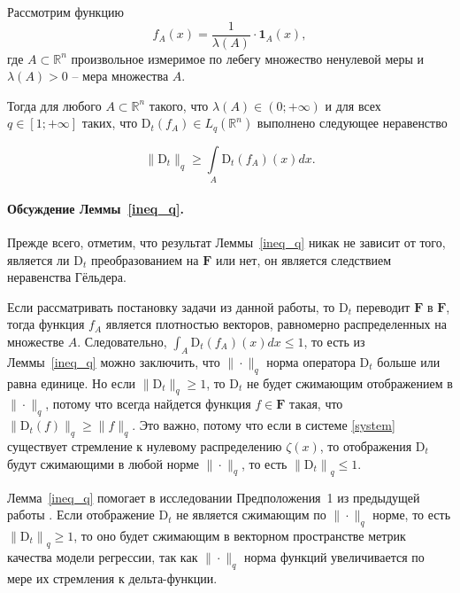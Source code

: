         \begin{lemma}[Веприков, 2023] \label{ineq_q}
            Рассмотрим функцию
            \begin{equation*}
                f_A(x) = \dfrac{1}{\lambda(A)} \cdot \textbf{1}_{A}(x),
            \end{equation*}
            где $A \subset \mathbb{R}^n$ произвольное измеримое по лебегу множество ненулевой меры и $\lambda(A) > 0$ -- мера множества $A$.
    
            Тогда для любого $A \subset \mathbb{R}^n$ такого, что $\lambda(A) \in (0; +\infty)$ и для всех $q \in [1; +\infty]$ таких, что $\text{D}_t(f_A) \in L_q(\mathbb{R}^n)$ выполнено следующее неравенство
    
            \begin{equation*}
                \|\text{D}_t\|_q \geq \int\limits_{A} \text{D}_t(f_A)(x)dx.
            \end{equation*}
        \end{lemma}
    
        \paragraph{Обсуждение Леммы~\ref{ineq_q}.} Прежде всего, отметим, что результат Леммы~\ref{ineq_q} никак не зависит от того, является ли $\text{D}_t$ преобразованием на $\textbf{F}$ или нет, он является следствием неравенства Гёльдера.
    
        Если рассматривать постановку задачи из данной работы, то $\text{D}_t$ переводит $\textbf{F}$ в $\textbf{F}$, тогда функция $f_A$ является плотностью векторов, равномерно распределенных на множестве $A$. Следовательно, $\int_{A} \text{D}_t(f_A)(x)dx \leq 1$, то есть из Леммы~\ref{ineq_q} можно заключить, что $\| \cdot \|_q$ норма оператора $\text{D}_t$ больше или равна единице. Но если $\|\text{D}_t\|_q \geq 1$, то $\text{D}_t$ не будет сжимающим отображением в $\|\cdot\|_q$, потому что всегда найдется функция $f \in \textbf{F}$ такая, что $\|\text{D}_t(f)\|_q \geq \|f\|_q$. Это важно, потому что если в системе \eqref{system} существует стремление к нулевому распределению $\zeta(x)$, то отображения $\text{D}_t$ будут сжимающими в любой норме $\| \cdot \|_q$, то есть $\left\|\text{D}_t\right\|_q \leq 1$. 
    
        Лемма~\ref{ineq_q} помогает в исследовании Предположения~1 из предыдущей работы \citep{khritankov2021hidden}. Если отображение $\text{D}_t$ не является сжимающим по $\| \cdot \|_q$ норме, то есть $\left\|\text{D}_t\right\|_q \geq 1$, то оно будет сжимающим в векторном пространстве метрик качества модели регрессии, так как $\| \cdot \|_q$ норма функций увеличивается по мере их стремления к дельта-функции.
    
